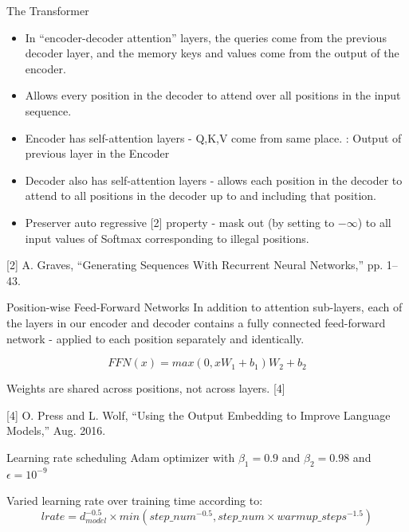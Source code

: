 \documentclass{beamer}
\begin{document}
\begin{frame}[fragile]{The Transformer}
\begin{center}
	\begin{itemize}
		\item In “encoder-decoder attention” layers, the queries come from the previous decoder layer, and the memory keys and values come from the output of the encoder.
		\item Allows every position in the decoder to attend over all positions in the input sequence.
		\item Encoder has self-attention layers - Q,K,V come from same place. : Output of previous layer in the Encoder
		\item Decoder also has self-attention layers - allows each position in the decoder to attend to all positions in the decoder up to and including that position.
		\item Preserver auto regressive [2] property - mask out (by setting to $ - \infty$) to all input values of Softmax corresponding to illegal positions.
	\end{itemize}
[2] A. Graves, “Generating Sequences With Recurrent Neural Networks,” pp. 1–43.
\end{center}
\end{frame}

\begin{frame}[fragile]{Position-wise Feed-Forward Networks}
In addition to attention sub-layers, each of the layers in our encoder and decoder contains a fully connected feed-forward network - applied to each position separately and identically.

$$FFN(x) = max(0, x W_{1} + b_{1}) W_{2} + b_{2}$$

Weights are shared across positions, not across layers. [4]

[4] O. Press and L. Wolf, “Using the Output Embedding to Improve Language Models,” Aug. 2016.
\end{frame}

\begin{frame}[fragile]{Learning rate scheduling}
Adam optimizer with $\beta_{1} = 0.9$ and $\beta_{2} = 0.98$ and $\epsilon = 10^{-9}$

Varied learning rate over training time according to:
$$lrate = d_{model}^{-0.5} \times min(step\_num^{-0.5}, step\_num \times warmup\_steps^{-1.5})$$
\end{frame}
\end{document}
